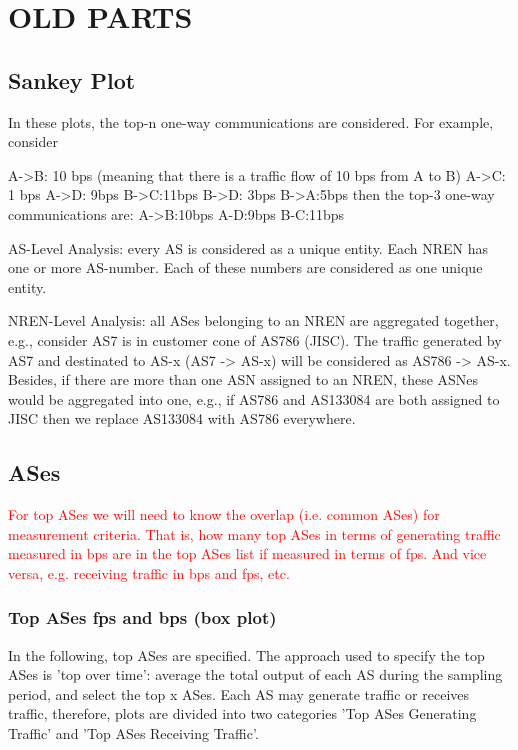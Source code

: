 \documentclass[10pt, journal, letterpaper]{IEEEtran}
\newcommand{\red}[1]{\textcolor{red}{#1}}
\begin{document}
\section{OLD PARTS}
\subsection{Sankey Plot}
In these plots, the top-n one-way communications are considered. For example, consider

A->B: 10 bps (meaning that there is a traffic flow of 10 bps from A to B)
A->C: 1 bps
A->D: 9bps
B->C:11bps
B->D: 3bps
B->A:5bps
then the top-3 one-way communications are:
A->B:10bps
A-D:9bps
B-C:11bps

AS-Level Analysis: every AS is considered as a unique entity. Each NREN has one or more AS-number. Each of these numbers are considered as one unique entity.

NREN-Level Analysis: all ASes belonging to an NREN are aggregated together, e.g., consider AS7 is in customer cone of AS786 (JISC). The traffic generated by AS7 and destinated to AS-x (AS7 -> AS-x) will be considered as AS786 -> AS-x. Besides, if there are more than one ASN assigned to an NREN, these ASNes would be aggregated into one, e.g., if AS786 and AS133084 are both assigned to JISC then we replace AS133084 with AS786 everywhere.



\subsection{ASes}

\red{For top ASes we will need to know the overlap (i.e. common ASes) for measurement criteria. That is, how many top ASes in terms of generating traffic measured in bps are in the top ASes list if measured in terms of fps. And vice versa, e.g. receiving traffic in bps and fps, etc.}

\subsubsection{Top ASes fps and bps (box plot)}
In the following, top ASes are specified. The approach used to specify the top ASes is 'top over time': average the total output of each AS during the sampling period, and select the top x ASes.
Each AS may generate traffic or receives traffic, therefore, plots are divided into two categories 'Top ASes Generating Traffic' and 'Top ASes Receiving Traffic'.
\end{document}
